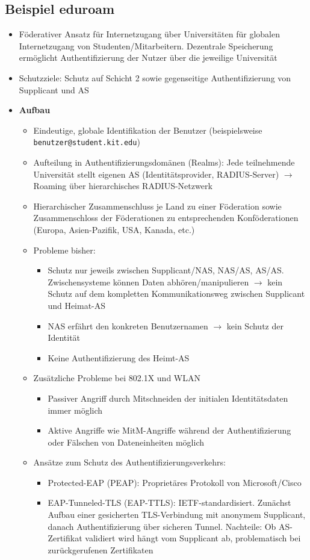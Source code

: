 \subsection{Beispiel eduroam}
\begin{itemize}
	\item Föderativer Ansatz für Internetzugang über Universitäten für globalen Internetzugang von Studenten/Mitarbeitern. Dezentrale Speicherung ermöglicht Authentifizierung der Nutzer über die jeweilige Universität
	\item Schutzziele: Schutz auf Schicht 2 sowie gegenseitige Authentifizierung von Supplicant und AS
	\item \textbf{Aufbau}
	\begin{itemize}
		\item Eindeutige, globale Identifikation der Benutzer (beispielsweise \texttt{benutzer@student.kit.edu})
		\item Aufteilung in Authentifizierungsdomänen (Realms): Jede teilnehmende Universität stellt eigenen AS (Identitätsprovider, RADIUS-Server) \(\rightarrow\) Roaming über hierarchisches RADIUS-Netzwerk
		\item Hierarchischer Zusammenschluss je Land zu einer Föderation sowie Zusammenschloss der Föderationen zu entsprechenden Konföderationen (Europa, Asien-Pazifik, USA, Kanada, etc.)
		\item Probleme bisher:
		\begin{itemize}
			\item Schutz nur jeweils zwischen Supplicant/NAS, NAS/AS, AS/AS. Zwischensysteme können Daten abhören/manipulieren \(\rightarrow\) kein Schutz auf dem kompletten Kommunikationsweg zwischen Supplicant und Heimat-AS
			\item NAS erfährt den konkreten Benutzernamen \(\rightarrow\) kein Schutz der Identität
			\item Keine Authentifizierung des Heimt-AS
		\end{itemize}
		\item Zusätzliche Probleme bei 802.1X und WLAN
		\begin{itemize}
			\item Passiver Angriff durch Mitschneiden der initialen Identitätsdaten immer möglich
			\item Aktive Angriffe wie MitM-Angriffe während der Authentifizierung oder Fälschen von Dateneinheiten möglich
		\end{itemize}
		\item Ansätze zum Schutz des Authentifizierungsverkehrs:
		\begin{itemize}
			\item Protected-EAP (PEAP): Proprietäres Protokoll von Microsoft/Cisco
			\item EAP-Tunneled-TLS (EAP-TTLS): IETF-standardisiert. Zunächst Aufbau einer gesicherten TLS-Verbindung mit anonymem Supplicant, danach Authentifizierung über sicheren Tunnel. Nachteile: Ob AS-Zertifikat validiert wird hängt vom Supplicant ab, problematisch bei zurückgerufenen Zertifikaten 
		\end{itemize}
	\end{itemize}
\end{itemize}



